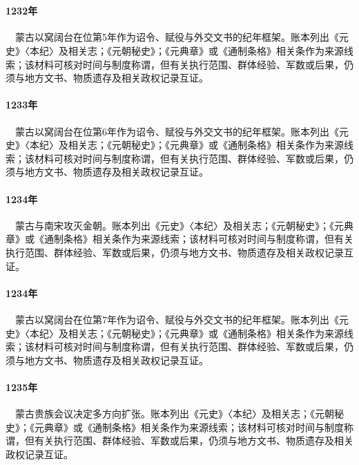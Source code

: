 \section{}

\paragraph{1232年}　蒙古以窝阔台在位第5年作为诏令、赋役与外交文书的纪年框架。账本列出《元史》〈本纪〉及相关志；《元朝秘史》；《元典章》或《通制条格》相关条作为来源线索；该材料可核对时间与制度称谓，但有关执行范围、群体经验、军数或后果，仍须与地方文书、物质遗存及相关政权记录互证。

\paragraph{1233年}　蒙古以窝阔台在位第6年作为诏令、赋役与外交文书的纪年框架。账本列出《元史》〈本纪〉及相关志；《元朝秘史》；《元典章》或《通制条格》相关条作为来源线索；该材料可核对时间与制度称谓，但有关执行范围、群体经验、军数或后果，仍须与地方文书、物质遗存及相关政权记录互证。

\paragraph{1234年}　蒙古与南宋攻灭金朝。账本列出《元史》〈本纪〉及相关志；《元朝秘史》；《元典章》或《通制条格》相关条作为来源线索；该材料可核对时间与制度称谓，但有关执行范围、群体经验、军数或后果，仍须与地方文书、物质遗存及相关政权记录互证。

\paragraph{1234年}　蒙古以窝阔台在位第7年作为诏令、赋役与外交文书的纪年框架。账本列出《元史》〈本纪〉及相关志；《元朝秘史》；《元典章》或《通制条格》相关条作为来源线索；该材料可核对时间与制度称谓，但有关执行范围、群体经验、军数或后果，仍须与地方文书、物质遗存及相关政权记录互证。

\paragraph{1235年}　蒙古贵族会议决定多方向扩张。账本列出《元史》〈本纪〉及相关志；《元朝秘史》；《元典章》或《通制条格》相关条作为来源线索；该材料可核对时间与制度称谓，但有关执行范围、群体经验、军数或后果，仍须与地方文书、物质遗存及相关政权记录互证。

